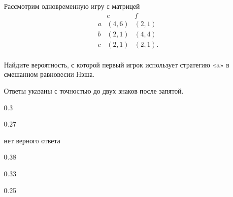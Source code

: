 
\begin{question}
Рассмотрим одновременную игру с матрицей \[
\begin{matrix}
   & e & f \\
a  & (4, 6) & (2, 1) \\
b  & (2, 1) & (4, 4) \\
c  & (2, 1) & (2, 1). \\
\end{matrix}
\]

Найдите вероятность, с которой первый игрок использует стратегию «a» в
смешанном равновесии Нэша.

Ответы указаны с точностью до двух знаков после запятой.
\begin{answerlist}
  \item 0.3
  \item 0.27
  \item нет верного ответа
  \item 0.38
  \item 0.33
  \item 0.25
\end{answerlist}
\end{question}



